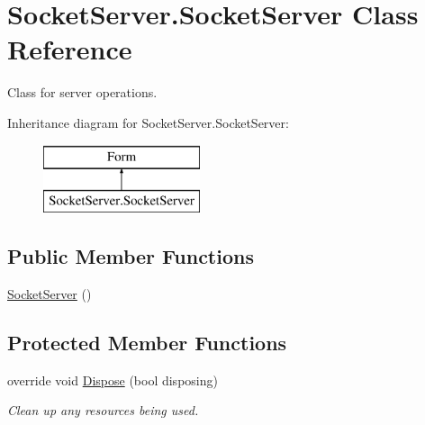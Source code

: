 \hypertarget{class_socket_server_1_1_socket_server}{}\section{Socket\+Server.\+Socket\+Server Class Reference}
\label{class_socket_server_1_1_socket_server}


Class for server operations.  


Inheritance diagram for Socket\+Server.\+Socket\+Server\+:\begin{figure}[H]
\begin{center}
\leavevmode
\includegraphics[height=2.000000cm]{class_socket_server_1_1_socket_server}
\end{center}
\end{figure}
\subsection*{Public Member Functions}
\begin{DoxyCompactItemize}
\item 
\hyperlink{class_socket_server_1_1_socket_server_a3f04ad72de3cc8570741afd76a169e4d}{Socket\+Server} ()
\end{DoxyCompactItemize}
\subsection*{Protected Member Functions}
\begin{DoxyCompactItemize}
\item 
override void \hyperlink{class_socket_server_1_1_socket_server_a577f703fecf496140d420e0049159905}{Dispose} (bool disposing)
\begin{DoxyCompactList}\small\item\em Clean up any resources being used. \end{DoxyCompactList}\end{DoxyCompactItemize}
